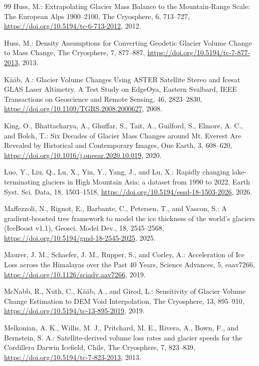 \begin{thebibliography}{99}
 Huss, M.: Extrapolating Glacier Mass Balance to the Mountain-Range Scale: The European Alps 1900–2100, The Cryosphere, 6, 713–727, \url{https://doi.org/10.5194/tc-6-713-2012}, 2012.

 Huss, M.: Density Assumptions for Converting Geodetic Glacier Volume Change to Mass Change, The Cryosphere, 7, 877–887, \url{https://doi.org/10.5194/tc-7-877-2013}, 2013.

 Kääb, A.: Glacier Volume Changes Using ASTER Satellite Stereo and Icesat GLAS Laser Altimetry. A Test Study on EdgeOya, Eastern Svalbard, IEEE Transactions on Geoscience and Remote Sensing, 46, 2823–2830, \url{https://doi.org/10.1109/TGRS.2008.2000627}, 2008.

 King, O., Bhattacharya, A., Ghuffar, S., Tait, A., Guilford, S., Elmore, A. C., and Bolch, T.: Six Decades of Glacier Mass Changes around Mt. Everest Are Revealed by Historical and Contemporary Images, One Earth, 3, 608–620, \url{https://doi.org/10.1016/j.oneear.2020.10.019}, 2020.

 Luo, Y., Liu, Q., Lu, X., Yin, Y., Yang, J., and Lu, X.: Rapidly changing lake-terminating glaciers in High Mountain Asia: a dataset from 1990 to 2022, Earth Syst. Sci. Data, 18, 1503--1518, \url{https://doi.org/10.5194/essd-18-1503-2026}, 2026.

 Maffezzoli, N., Rignot, E., Barbante, C., Petersen, T., and Vascon, S.: A gradient-boosted tree framework to model the ice thickness of the world's glaciers (IceBoost v1.1), Geosci. Model Dev., 18, 2545--2568, \url{https://doi.org/10.5194/gmd-18-2545-2025}, 2025.

 Maurer, J. M., Schaefer, J. M., Rupper, S., and Corley, A.: Acceleration of Ice Loss across the Himalayas over the Past 40 Years, Science Advances, 5, eaav7266, \url{https://doi.org/10.1126/sciadv.aav7266}, 2019.

 McNabb, R., Nuth, C., Kääb, A., and Girod, L.: Sensitivity of Glacier Volume Change Estimation to DEM Void Interpolation, The Cryosphere, 13, 895–910, \url{https://doi.org/10.5194/tc-13-895-2019}, 2019.

 Melkonian, A. K., Willis, M. J., Pritchard, M. E., Rivera, A., Bown, F., and Bernstein, S. A.: Satellite-derived volume loss rates and glacier speeds for the Cordillera Darwin Icefield, Chile, The Cryosphere, 7, 823–839, \url{https://doi.org/10.5194/tc-7-823-2013}, 2013.


\end{thebibliography}
